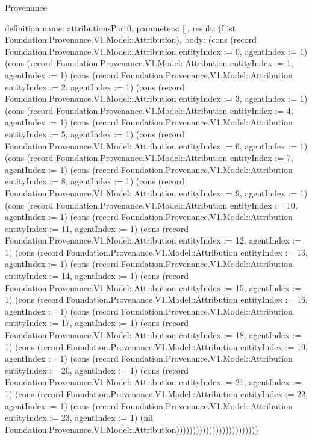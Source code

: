 \begin{lexlean}{Provenance}
\begin{semanticmodule}
definition{
  name: attributionsPart0,
  parameters: [],
  result: (List Foundation.Provenance.V1.Model::Attribution),
  body: (cons (record Foundation.Provenance.V1.Model::Attribution {entityIndex := 0, agentIndex := 1}) (cons (record Foundation.Provenance.V1.Model::Attribution {entityIndex := 1, agentIndex := 1}) (cons (record Foundation.Provenance.V1.Model::Attribution {entityIndex := 2, agentIndex := 1}) (cons (record Foundation.Provenance.V1.Model::Attribution {entityIndex := 3, agentIndex := 1}) (cons (record Foundation.Provenance.V1.Model::Attribution {entityIndex := 4, agentIndex := 1}) (cons (record Foundation.Provenance.V1.Model::Attribution {entityIndex := 5, agentIndex := 1}) (cons (record Foundation.Provenance.V1.Model::Attribution {entityIndex := 6, agentIndex := 1}) (cons (record Foundation.Provenance.V1.Model::Attribution {entityIndex := 7, agentIndex := 1}) (cons (record Foundation.Provenance.V1.Model::Attribution {entityIndex := 8, agentIndex := 1}) (cons (record Foundation.Provenance.V1.Model::Attribution {entityIndex := 9, agentIndex := 1}) (cons (record Foundation.Provenance.V1.Model::Attribution {entityIndex := 10, agentIndex := 1}) (cons (record Foundation.Provenance.V1.Model::Attribution {entityIndex := 11, agentIndex := 1}) (cons (record Foundation.Provenance.V1.Model::Attribution {entityIndex := 12, agentIndex := 1}) (cons (record Foundation.Provenance.V1.Model::Attribution {entityIndex := 13, agentIndex := 1}) (cons (record Foundation.Provenance.V1.Model::Attribution {entityIndex := 14, agentIndex := 1}) (cons (record Foundation.Provenance.V1.Model::Attribution {entityIndex := 15, agentIndex := 1}) (cons (record Foundation.Provenance.V1.Model::Attribution {entityIndex := 16, agentIndex := 1}) (cons (record Foundation.Provenance.V1.Model::Attribution {entityIndex := 17, agentIndex := 1}) (cons (record Foundation.Provenance.V1.Model::Attribution {entityIndex := 18, agentIndex := 1}) (cons (record Foundation.Provenance.V1.Model::Attribution {entityIndex := 19, agentIndex := 1}) (cons (record Foundation.Provenance.V1.Model::Attribution {entityIndex := 20, agentIndex := 1}) (cons (record Foundation.Provenance.V1.Model::Attribution {entityIndex := 21, agentIndex := 1}) (cons (record Foundation.Provenance.V1.Model::Attribution {entityIndex := 22, agentIndex := 1}) (cons (record Foundation.Provenance.V1.Model::Attribution {entityIndex := 23, agentIndex := 1}) (nil Foundation.Provenance.V1.Model::Attribution)))))))))))))))))))))))))
}


\end{semanticmodule}
\end{lexlean}
